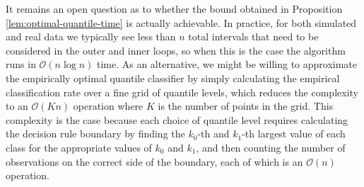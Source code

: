 It remains an open question as to whether the bound obtained in Proposition
\ref{lem:optimal-quantile-time} is actually achievable.  In practice, for both
simulated and real data we typically see less than $n$ total intervals that need
to be considered in the outer and inner loops, so when this is the case the
algorithm runs in $\mathcal{O}(n \log n)$ time.  As an alternative, we might be
willing to approximate the empirically optimal quantile classifier by simply
calculating the empirical classification rate over a fine grid of quantile
levels, which reduces the complexity to an $\mathcal{O}(Kn)$ operation where $K$
is the number of points in the grid.  This complexity is the case because each
choice of quantile level requires calculating the decision rule boundary by
finding the $k_0$-th and $k_1$-th largest value of each class for the
appropriate values of $k_0$ and $k_1$, and then counting the number of
observations on the correct side of the boundary, each of which is an
$\mathcal{O}(n)$ operation.




